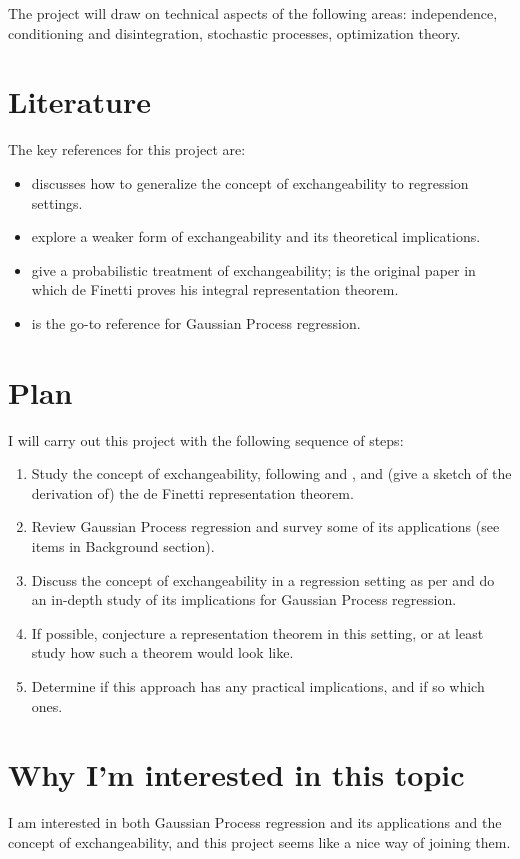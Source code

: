 \documentclass[]{STAT_547C}
\begin{document}
The project will draw on technical aspects of the following areas: independence, conditioning and disintegration, stochastic processes, optimization theory.


\section{Literature}

The key references for this project are:

\begin{itemize}
  \item \cite{McCullagh:2005:ExchAndReg} discusses how to generalize the concept of exchangeability to regression settings. 
  \item \cite{CampbellEtAl:2019:LocalExch} explore a weaker form of exchangeability and its theoretical implications.
  \item \cite{Kingman:1978, Bernardo:1996:Exch} give a probabilistic treatment of exchangeability; \cite{deFinetti:1930:RepTheorem} is the original paper in which de Finetti proves his integral representation theorem.
  \item \cite{RasmussenWilliams:2006} is the go-to reference for Gaussian Process regression.
\end{itemize}


\section{Plan}

I will carry out this project with the following sequence of steps: 
\begin{enumerate}
  \item Study the concept of exchangeability, following \cite{Kingman:1978} and \cite{Bernardo:1996:Exch}, and (give a sketch of the derivation of) the de Finetti representation theorem.
  \item Review Gaussian Process regression and survey some of its applications (see items in Background section).
  \item Discuss the concept of exchangeability in a regression setting as per \cite{McCullagh:2005:ExchAndReg} and do an in-depth study of its implications for Gaussian Process regression. 
  \item If possible, conjecture a representation theorem in this setting, or at least study how such a theorem would look like.
  \item Determine if this approach has any practical implications, and if so which ones.
\end{enumerate}


\section{Why I'm interested in this topic}

I am interested in both Gaussian Process regression and its applications and the concept of exchangeability, and this project seems like a nice way of joining them.


\printbibliography
\end{document}
